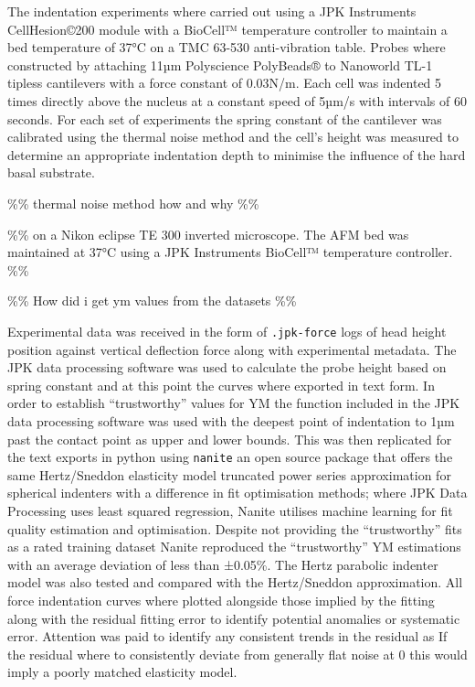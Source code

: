 \documentclass[
  paper=a4,
  ,captions=tableheading
]{scrartcl}
\begin{document}
The indentation experiments where carried out using a JPK Instruments
CellHesion©200 module with a BioCell™ temperature controller to maintain
a bed temperature of 37°C on a TMC 63-530 anti-vibration table. Probes
where constructed by attaching 11µm Polyscience PolyBeads® to Nanoworld
TL-1 tipless cantilevers with a force constant of 0.03N/m. Each cell was
indented 5 times directly above the nucleus at a constant speed of 5µm/s
with intervals of 60 seconds. For each set of experiments the spring
constant of the cantilever was calibrated using the thermal noise method
and the cell's height was measured to determine an appropriate
indentation depth to minimise the influence of the hard basal substrate.

\%\% thermal noise method how and why \%\%

\%\% on a Nikon eclipse TE 300 inverted microscope. The AFM bed was
maintained at 37°C using a JPK Instruments BioCell™ temperature
controller. \%\%

\%\% How did i get ym values from the datasets \%\%

Experimental data was received in the form of \texttt{.jpk-force} logs
of head height position against vertical deflection force along with
experimental metadata. The JPK data processing software was used to
calculate the probe height based on spring constant and at this point
the curves where exported in text form. In order to establish
``trustworthy'' values for YM the function included in the JPK data
processing software was used with the deepest point of indentation to
1µm past the contact point as upper and lower bounds. This was then
replicated for the text exports in python using \texttt{nanite} an open
source package that offers the same Hertz/Sneddon elasticity model
truncated power series approximation for spherical indenters with a
difference in fit optimisation methods; where JPK Data Processing uses
least squared regression, Nanite utilises machine learning for fit
quality estimation and optimisation. Despite not providing the
``trustworthy'' fits as a rated training dataset Nanite reproduced the
``trustworthy'' YM estimations with an average deviation of less than
±0.05\%. The Hertz parabolic indenter model was also tested and compared
with the Hertz/Sneddon approximation. All force indentation curves where
plotted alongside those implied by the fitting along with the residual
fitting error to identify potential anomalies or systematic error.
Attention was paid to identify any consistent trends in the residual as
If the residual where to consistently deviate from generally flat noise
at 0 this would imply a poorly matched elasticity model.
\end{document}
